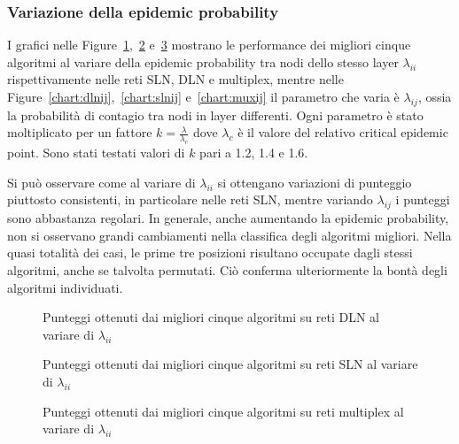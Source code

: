 




\subsubsection{Variazione della epidemic probability}

I grafici nelle Figure~\ref{chart:dlnii},~\ref{chart:slnii} e~\ref{chart:muxii} mostrano le performance dei 
migliori cinque algoritmi al variare della epidemic probability tra nodi dello stesso layer $\lambda_{ii}$ rispettivamente nelle 
reti SLN, DLN e multiplex, mentre nelle Figure~\ref{chart:dlnij},~\ref{chart:slnij} e~\ref{chart:muxij} il parametro 
che varia è $\lambda_{ij}$, ossia
la probabilità di contagio tra nodi in layer differenti.
Ogni parametro è stato moltiplicato per un fattore $k = \frac{\lambda}{\lambda_c}$ dove $\lambda_c$ è il valore del relativo 
critical epidemic point.
Sono stati testati valori di $k$ pari a \num{1.2}, \num{1.4} e \num{1.6}.

Si può osservare come al variare di $\lambda_{ii}$ si ottengano variazioni di punteggio piuttosto consistenti, in particolare nelle 
reti SLN, mentre variando $\lambda_{ij}$ i punteggi sono abbastanza regolari.
In generale, anche aumentando la epidemic probability, non si osservano grandi cambiamenti nella classifica degli algoritmi migliori.
Nella quasi totalità dei casi, le prime tre posizioni risultano occupate dagli stessi algoritmi, anche se talvolta 
permutati. Ciò conferma ulteriormente la bontà degli algoritmi individuati.


\begin{figure}
    \centering
    \resizebox{\textwidth}{!}{}
    
    \caption{Punteggi ottenuti dai migliori cinque algoritmi su reti DLN al variare di $\lambda_{ii}$}
    \label{chart:dlnii}
\end{figure}

\begin{figure}
    \centering
    \resizebox{\textwidth}{!}{}
    
    \caption{Punteggi ottenuti dai migliori cinque algoritmi su reti SLN al variare di $\lambda_{ii}$}
    \label{chart:slnii}
\end{figure}

\begin{figure}
    \centering
    \resizebox{\textwidth}{!}{}
    
    \caption{Punteggi ottenuti dai migliori cinque algoritmi su reti multiplex al variare di $\lambda_{ii}$}
    \label{chart:muxii}
\end{figure}


